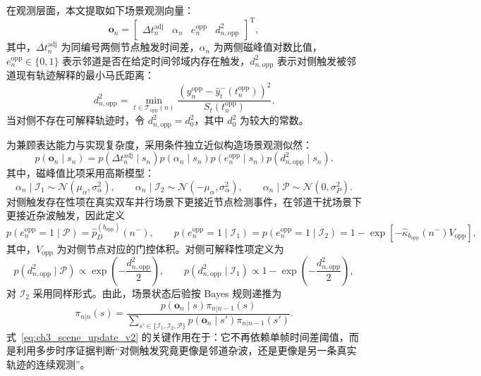 \documentclass{xdupgthesis}
\begin{document}
在观测层面，本文提取如下场景观测向量：
\begin{equation}
	\mathbf o_n=
	\begin{bmatrix}
		\Delta t_n^{\mathrm{adj}} &
		\alpha_n &
		e_n^{\mathrm{opp}} &
		d_{n,\mathrm{opp}}^2
	\end{bmatrix}^{\mathrm T},
	\label{eq:ch3_scene_obs_v2}
\end{equation}
其中，$\Delta t_n^{\mathrm{adj}}$ 为同编号两侧节点触发时间差，$\alpha_n$ 为两侧磁峰值对数比值，$e_n^{\mathrm{opp}}\in\{0,1\}$ 表示邻道是否在给定时间邻域内存在触发，$d_{n,\mathrm{opp}}^2$ 表示对侧触发被邻道现有轨迹解释的最小马氏距离：
\begin{equation}
	d_{n,\mathrm{opp}}^2=
	\min_{t\in\mathcal T_{\mathrm{opp}}(n)}
	\frac{\left(y_n^{\mathrm{opp}}-\hat y^-_t(t_n^{\mathrm{opp}})\right)^2}{S_t(t_n^{\mathrm{opp}})}.
	\label{eq:ch3_dopp_v2}
\end{equation}
当对侧不存在可解释轨迹时，令 $d_{n,\mathrm{opp}}^2=d_0^2$，其中 $d_0^2$ 为较大的常数。

为兼顾表达能力与实现复杂度，采用条件独立近似构造场景观测似然：
\begin{equation}
	p(\mathbf o_n\mid s_n)=
	p(\Delta t_n^{\mathrm{adj}}\mid s_n)
	p(\alpha_n\mid s_n)
	p(e_n^{\mathrm{opp}}\mid s_n)
	p(d_{n,\mathrm{opp}}^2\mid s_n).
	\label{eq:ch3_scene_likelihood_v2}
\end{equation}
其中，磁峰值比项采用高斯模型：
\begin{equation}
	\alpha_n\mid \mathcal I_1\sim\mathcal N(\mu_\alpha,\sigma_\alpha^2),\qquad
	\alpha_n\mid \mathcal I_2\sim\mathcal N(-\mu_\alpha,\sigma_\alpha^2),\qquad
	\alpha_n\mid \mathcal P\sim\mathcal N(0,\sigma_P^2).
	\label{eq:ch3_alpha_model_v2}
\end{equation}
对侧触发存在性项在真实双车并行场景下更接近节点检测事件，在邻道干扰场景下更接近杂波触发，因此定义
\begin{equation}
	p(e_n^{\mathrm{opp}}=1\mid \mathcal P)=\hat p_D^{(b_{\mathrm{opp}})}(n^-),
	\qquad
	p(e_n^{\mathrm{opp}}=1\mid \mathcal I_1)=p(e_n^{\mathrm{opp}}=1\mid \mathcal I_2)=1-\exp\left[-\hat \kappa_{b_{\mathrm{opp}}}(n^-)V_{\mathrm{opp}}\right],
	\label{eq:ch3_eopp_model_v2}
\end{equation}
其中，$V_{\mathrm{opp}}$ 为对侧节点对应的门控体积。对侧可解释性项定义为
\begin{equation}
	p(d_{n,\mathrm{opp}}^2\mid \mathcal P)\propto \exp\left(-\frac{d_{n,\mathrm{opp}}^2}{2}\right),
	\qquad
	p(d_{n,\mathrm{opp}}^2\mid \mathcal I_1)\propto 1-\exp\left(-\frac{d_{n,\mathrm{opp}}^2}{2}\right),
	\label{eq:ch3_dopp_model_v2}
\end{equation}
对 $\mathcal I_2$ 采用同样形式。由此，场景状态后验按 Bayes 规则递推为
\begin{equation}
	\pi_{n|n}(s)=
	\frac{p(\mathbf o_n\mid s)\pi_{n|n-1}(s)}{\sum_{s'\in\{\mathcal I_1,\mathcal I_2,\mathcal P\}}p(\mathbf o_n\mid s')\pi_{n|n-1}(s')}.
	\label{eq:ch3_scene_update_v2}
\end{equation}
式~\eqref{eq:ch3_scene_update_v2} 的关键作用在于：它不再依赖单帧时间差阈值，而是利用多步时序证据判断“对侧触发究竟更像是邻道杂波，还是更像是另一条真实轨迹的连续观测”。
\end{document}
